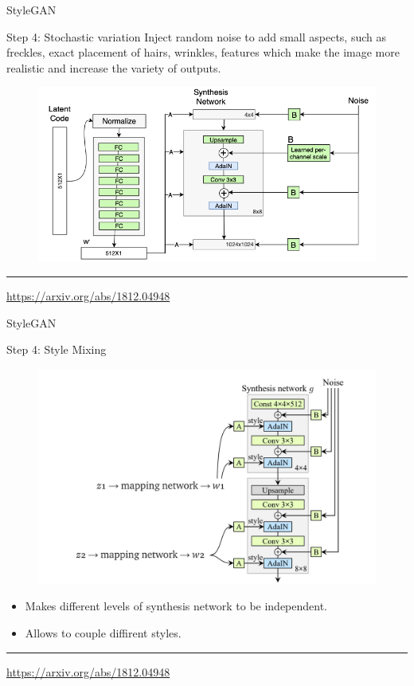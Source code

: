 \documentclass{beamer}
\begin{document}
\begin{frame}{StyleGAN}
	\begin{block}{Step 4: Stochastic variation}
		Inject random noise to add small aspects, such as freckles, exact placement of hairs, wrinkles, features which make the image more realistic and increase the variety of outputs.
		\begin{figure}
			\centering
			\includegraphics[width=0.9\linewidth]{figs/stylegan_noise}
		\end{figure}
	\end{block}
	\vfill
	\hrule\medskip 
	{\scriptsize \href{https://arxiv.org/abs/1812.04948}{https://arxiv.org/abs/1812.04948}}
\end{frame}
\begin{frame}{StyleGAN}
	\begin{block}{Step 4: Style Mixing}
		\vspace{-0.33cm}
		\begin{figure}
			\centering
			\includegraphics[width=0.8\linewidth]{figs/stylegan_mix_reg}
		\end{figure}
	\begin{itemize}
		\item Makes different levels of synthesis network to be independent.
		\item Allows to couple diffirent styles.
	\end{itemize}
	\end{block}
	\vfill
	\hrule\medskip 
	{\scriptsize \href{https://arxiv.org/abs/1812.04948}{https://arxiv.org/abs/1812.04948}}
\end{frame}
\end{document}
